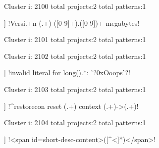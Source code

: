 Cluster i: 2100
total projects:2
total patterns:1
\begin{multicols}{1}
\begin{description}[noitemsep,topsep=0pt]
\item [[2] ] \cverb!Versi.+n (.+) ([0-9]+).([0-9])+ megabytes!
\end{description}
\end{multicols}







Cluster i: 2101
total projects:2
total patterns:1
\begin{multicols}{1}
\end{multicols}







Cluster i: 2102
total projects:2
total patterns:1
\begin{multicols}{1}
\begin{description}[noitemsep,topsep=0pt]
\item [[2] ] \cverb!invalid literal for long().*: '?0xOoops'?!
\end{description}
\end{multicols}







Cluster i: 2103
total projects:2
total patterns:1
\begin{multicols}{1}
\begin{description}[noitemsep,topsep=0pt]
\item [[2] ] \cverb!^restorecon reset (.+) context (.+)->(.+)!
\end{description}
\end{multicols}







Cluster i: 2104
total projects:2
total patterns:1
\begin{multicols}{1}
\begin{description}[noitemsep,topsep=0pt]
\item [[2] ] \cverb!<span id=short-desc-content>([^<]*)</span>!
\end{description}
\end{multicols}








